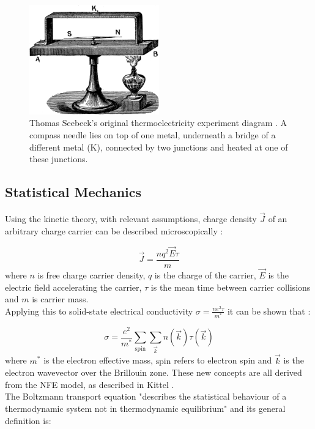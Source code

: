 \documentclass[a4paper,12pt]{article}
\begin{document}
\begin{figure}
	\centering
	\includegraphics[width=0.5\textwidth]{seebeck-experiment-black.png}
	\caption{Thomas Seebeck's original thermoelectricity experiment
	diagram \cite{seebeck-original}. A compass needle lies on top of
	one metal, underneath a bridge of a different metal (K), connected
	by two junctions and heated at one of these junctions.}
	\label{seebeck-experiment}
\end{figure}

\subsection{Statistical Mechanics}
Using the kinetic theory, with relevant assumptions, charge density
$\vec{J}$ of an arbitrary charge carrier can be described
microscopically \cite{kittel}:

\begin{equation}
\label{charge-density}
	\vec{J} = \frac{nq^2\vec{E} \tau}{m}
\end{equation}
where $n$ is free charge carrier density, $q$ is the charge of the
carrier, $\vec{E}$ is the electric field accelerating the
carrier, $\tau$ is the mean time between carrier collisions and $m$ is
carrier mass.\\
Applying this to solid-state electrical conductivity $\sigma = \frac{ne^2
\tau}{m^*}$ it can be shown that \cite{ziman}:

\begin{equation}
\label{micro-elec}
	\sigma = \frac{e^2}{m^*} \sum_{\mathrm{spin}} \sum_{\vec{k}}
	n(\vec{k}) \tau(\vec{k})
\end{equation}
where $m^*$ is the electron effective mass, $\mathrm{spin}$ refers to
electron spin and $\vec{k}$ is the electron wavevector over the
Brillouin zone. These new concepts are all derived from the \ac{NFE}
model, as described in Kittel \cite{kittel}.\\
The Boltzmann transport equation "describes the statistical behaviour
of a thermodynamic system not in thermodynamic equilibrium"
\cite{wiki-boltz} and its general definition is:
\end{document}
